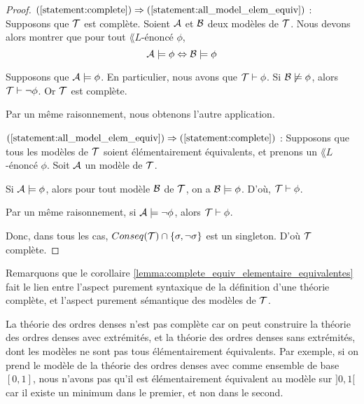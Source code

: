\documentclass[a4paper, 12pt]{report}
\begin{document}
\ifdefined\outputproof
\begin{proof}
	$(\ref{statement:complete}) \implies
	(\ref{statement:all_model_elem_equiv})$ :
	Supposons que $\theory{T}$ est complète. Soient $\struct{A}$ et $\struct{B}$
	deux modèles de $\theory{T}$.
	Nous devons alors montrer que pour tout $\lang{L}$-énoncé $\phi$,
	\begin{equation}
		\struct{A} \models \phi \Leftrightarrow \struct{B} \models \phi
	\end{equation}

	Supposons que $\struct{A} \models \phi$. En particulier, nous avons que
	$\theory{T} \satisfies \phi$.
	Si $\struct{B} \not\models \phi$, alors $\theory{T} \satisfies \neg
	\phi$. Or $\theory{T}$ est complète.

	Par un même raisonnement, nous obtenons l'autre application.

	$(\ref{statement:all_model_elem_equiv}) \implies (\ref{statement:complete})$
	:
	Supposons que tous les modèles de $\theory{T}$ soient élémentairement
	équivalents, et prenons un $\lang{L}$-énoncé $\phi$. Soit $\struct{A}$ un
	modèle de $\theory{T}$.

	Si $\struct{A} \models \phi$, alors pour tout modèle $\struct{B}$ de $\theory{T}$, on
	a $\struct{B} \models \phi$. D'où, $\theory{T} \satisfies \phi$.

	Par un même raisonnement, si $\struct{A} \models \neg \phi$, alors
	$\theory{T} \satisfies \phi$.

	Donc, dans tous les cas, $Conseq(\theory{T}) \inter \GSset{\sigma, \neg \sigma}$ est
	un singleton. D'où $\theory{T}$ complète.
\end{proof}
\fi

Remarquons que le corollaire \ref{lemma:complete_equiv_elementaire_equivalentes}
fait le lien entre l'aspect purement syntaxique de la définition d'une théorie
complète, et l'aspect purement sémantique des modèles de $\theory{T}$.

\begin{exemple}
	La théorie des ordres denses n'est pas complète car on peut construire la
	théorie des ordres denses avec extrémités, et la théorie des ordres denses
	sans extrémités, dont les modèles ne sont pas tous élémentairement
	équivalents. Par exemple, si on prend le modèle de la théorie des ordres
	denses avec comme ensemble de base $[0, 1]$, nous n'avons pas qu'il est
	élémentairement équivalent au modèle sur $]0, 1[$ car il existe un minimum dans
	le premier, et non dans le second.
\end{exemple}
\end{document}
